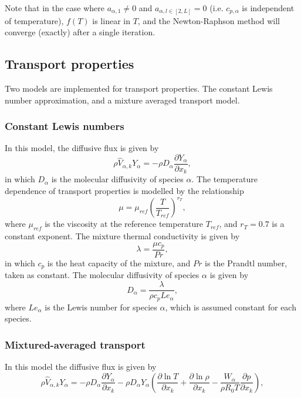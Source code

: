 \documentclass[notitlepage]{revtex4-1}
\begin{document}
Note that in the case where $a_{\alpha,1}\ne0$ and $a_{\alpha,l\in\left[2,L\right]}=0$ (i.e. $c_{p,\alpha}$ is independent of temperature), $f\left(T\right)$ is linear in $T$, and the Newton-Raphson method will converge (exactly) after a single iteration.

\subsection{Transport properties}

Two models are implemented for transport properties. The constant Lewis number approximation, and a mixture averaged transport model.

\subsubsection{Constant Lewis numbers}

In this model, the diffusive flux is given by
\begin{equation}\rho\hat{V}_{\alpha,k}Y_{\alpha}=-\rho{D}_{\alpha}\frac{\partial{Y}_{\alpha}}{\partial{x}_{k}},\end{equation}
in which $D_{\alpha}$ is the molecular diffusivity of species $\alpha$. The temperature dependence of transport properties is modelled by the relationship
\begin{equation}\mu=\mu_{ref}\left(\frac{T}{T_{ref}}\right)^{r_{T}},\label{eq:tdtp_mu}\end{equation}
where $\mu_{ref}$ is the viscosity at the reference temperature $T_{ref}$, and $r_{T}=0.7$ is a constant exponent. The mixture thermal conductivity is given by
\begin{equation}\lambda=\frac{\mu{c}_{p}}{Pr},\end{equation}
in which $c_{p}$ is the heat capacity of the mixture, and $Pr$ is the Prandtl number, taken as constant. The molecular diffusivity of species $\alpha$ is given by
\begin{equation}D_{\alpha}=\frac{\lambda}{\rho{c}_{p}Le_{\alpha}},\end{equation}
where $Le_{\alpha}$ is the Lewis number for species $\alpha$, which is assumed constant for each species.

\subsubsection{Mixtured-averaged transport}

In this model the diffusive flux is given by 
\begin{equation}\rho\hat{V}_{\alpha,k}Y_{\alpha}=-\rho{D}_{\alpha}\frac{\partial{Y}_{\alpha}}{\partial{x}_{k}}-\rho{D}_{\alpha}Y_{\alpha}\left(\frac{\partial\ln{T}}{\partial{x}_{k}}+\frac{\partial\ln\rho}{\partial{x}_{k}}-\frac{W_{\alpha}}{\rho{R}_{0}T}\frac{\partial{p}}{\partial{x}_{k}}\right),\end{equation}
\end{document}
